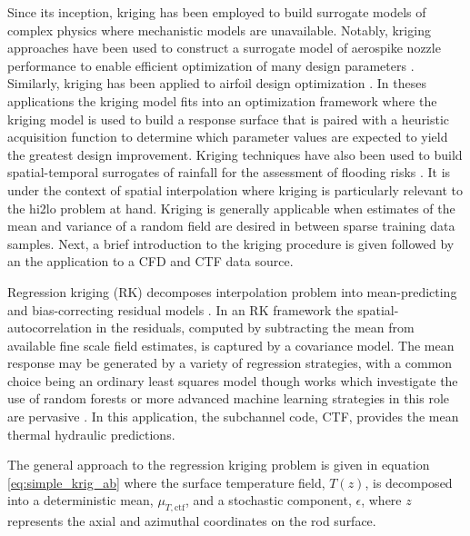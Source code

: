 Since its inception, kriging has been employed to build surrogate models of complex physics where mechanistic models are unavailable.  Notably, kriging approaches have been used to construct a surrogate model of aerospike nozzle performance to enable efficient optimization of many design parameters \cite{simpson2001kriging}.  Similarly, kriging has been applied to airfoil design optimization \cite{jeong2005efficient}.  In theses applications the kriging model fits into an optimization framework where the kriging model is used to build a response surface that is paired with a heuristic acquisition function to determine which parameter values are expected to yield the greatest design improvement. 
Kriging techniques have also been used to build spatial-temporal surrogates of rainfall for the assessment of flooding risks \cite{hsu2011integrated}.  It is under the context of spatial interpolation where kriging is particularly relevant to the hi2lo problem at hand. Kriging is generally applicable when estimates of the mean and variance of a random field are desired in between sparse training data samples.    Next, a brief introduction to the kriging procedure is given followed by an the application to a CFD and CTF data source.

Regression kriging (RK) decomposes interpolation problem into mean-predicting and bias-correcting residual models \cite{Hengl07}.  In an RK framework the spatial-autocorrelation in the residuals, computed by subtracting the mean from available fine scale field estimates, is captured by a covariance model.  The mean response may be generated by a variety of regression strategies, with a common choice being an ordinary least squares model though works which investigate the use of random forests or more advanced machine learning strategies in this role are pervasive \cite{LI20111647} \cite{LI2017112}.  In this application, the subchannel code, CTF, provides the mean thermal hydraulic predictions.

The general approach to the regression kriging problem is given in equation \ref{eq:simple_krig_ab} where the surface temperature field, $T(z)$, is decomposed into a deterministic mean, $\mu_{T, \mathrm{ctf}}$, and a stochastic component, $\epsilon$, where $z$ represents the axial and azimuthal coordinates on the rod surface.  

